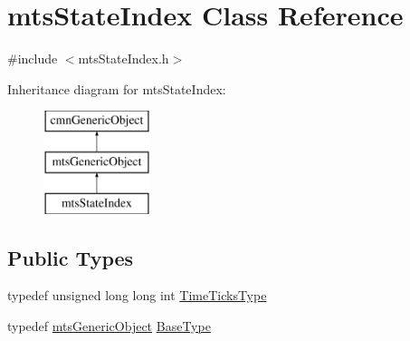 \hypertarget{classmts_state_index}{}\section{mts\+State\+Index Class Reference}
\label{classmts_state_index}


{\ttfamily \#include $<$mts\+State\+Index.\+h$>$}

Inheritance diagram for mts\+State\+Index\+:\begin{figure}[H]
\begin{center}
\leavevmode
\includegraphics[height=3.000000cm]{d2/d0a/classmts_state_index}
\end{center}
\end{figure}
\subsection*{Public Types}
\begin{DoxyCompactItemize}
\item 
typedef unsigned long long int \hyperlink{classmts_state_index_a80d0a5acdec3b616347ddea2912b6294}{Time\+Ticks\+Type}
\item 
typedef \hyperlink{classmts_generic_object}{mts\+Generic\+Object} \hyperlink{classmts_state_index_a9b228c6cd3d48921c5253fd6b1a95800}{Base\+Type}
\end{DoxyCompactItemize}
